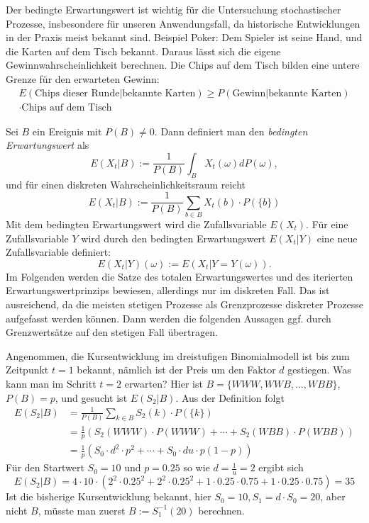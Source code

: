 \begin{defi}

Der bedingte Erwartungswert ist wichtig für die Untersuchung stochastischer Prozesse,
insbesondere für unseren Anwendungsfall, da historische Entwicklungen in der Praxis 
meist bekannt sind. Beispiel Poker: Dem Spieler ist seine Hand, und die Karten auf dem 
Tisch bekannt. Daraus lässt sich die eigene Gewinnwahrscheinlichkeit berechnen. Die Chips auf
dem Tisch bilden eine untere Grenze für den erwarteten Gewinn:
$$
\begin{aligned}
E(\text{Chips dieser Runde}|\text{bekannte Karten}) \ge P(\text{Gewinn}|\text{bekannte Karten}) 
\\ \cdot \text{Chips auf dem Tisch}
\end{aligned}
$$

Sei $B$ ein Ereignis mit $P(B) \neq 0$. Dann definiert man
den \textit{bedingten Erwartungswert} als $$E(X_t|B):=  \frac{1}{P(B)} \int_{B}^{} X_t(\omega) dP(\omega),$$
und für einen diskreten Wahrscheinlichkeitsraum reicht
$$E(X_t|B):= \frac{1}{P(B)}\sum_{b \in B} X_t(b) \cdot P(\{ b \})$$
Mit dem bedingten Erwartungswert wird die Zufallsvariable $E(X_t)$.
Für eine Zufallsvariable $Y$ wird durch den bedingten Erwartungswert $E(X_t|Y)$ eine neue Zufallsvariable definiert:
$$E(X_t|Y)(\omega) := E(X_t|Y=Y(\omega)).$$
Im Folgenden werden die Satze des totalen Erwartungswertes und des iterierten Erwartungswertprinzips bewiesen,
allerdings nur im diskreten Fall. Das ist ausreichend, da die meisten stetigen 
Prozesse als Grenzprozesse diskreter Prozesse aufgefasst werden können.
Dann werden die folgenden Aussagen ggf. durch Grenzwertsätze auf den stetigen Fall übertragen. 

\end{defi}

\begin{bsp}[Rechenbeispiel]
Angenommen, die Kursentwicklung im dreistufigen Binomialmodell ist bis zum 
Zeitpunkt $t=1$ bekannt, nämlich ist der Preis um den Faktor $d$ gestiegen. 
Was kann man im Schritt $t=2$ erwarten? Hier ist $B=\{WWW, WWB, \dots, WBB \}$, $P(B)=p$, und gesucht ist $E(S_2|B)$. Aus der Definition folgt
$$
\begin{aligned}
E(S_2|B) &= \frac{1}{P(B)}\sum_{k \in B} S_2(k) \cdot P(\{ k \}) \\ &=\frac{1}{p}(S_2(WWW) \cdot P(WWW)+ \cdots + S_2(WBB) \cdot P(WBB)) \\
&= \frac{1}{p} (S_0 \cdot d^2 \cdot  p^2 + \cdots + S_0 \cdot d u \cdot p (1-p))
\end{aligned}
$$
Für den Startwert $S_0=10$ und $p=0.25$ so wie $d=\frac{1}{u}=2$ ergibt sich
$$E(S_2|B)=4 \cdot 10 \cdot \left( 2^2 \cdot 0.25^2 + 2^2 \cdot 0.25^2 + 1 \cdot 0.25\cdot 0.75 + 1 \cdot 0.25\cdot 0.75 \right)=35$$
Ist die bisherige Kursentwicklung bekannt, hier $S_0=10, S_1 = d \cdot S_0=20$, aber nicht $B$, müsste man zuerst $B:=S_1^{-1}(20)$ berechnen.
\end{bsp}

